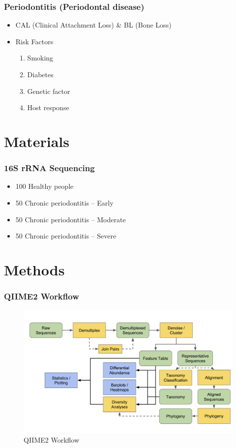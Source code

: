 \documentclass{beamer}
\begin{document}
    \begin{frame}
        \frametitle{Periodontitis (Periodontal disease)}

        \begin{itemize}
            \item CAL (Clinical Attachment Loss) \& BL (Bone Loss) \cite{periodontitis1}
            \item Risk Factors \cite{periodontitis2}
            \begin{enumerate}
                \item Smoking
                \item Diabetes
                \item Genetic factor
                \item Host response
            \end{enumerate}
        \end{itemize}
    \end{frame}

    \section{Materials}
    \begin{frame}
        \frametitle{16S rRNA Sequencing}

        \begin{itemize}
            \item 100 Healthy people
            \item 50 Chronic periodontitis -- Early
            \item 50 Chronic periodontitis -- Moderate
            \item 50 Chronic periodontitis -- Severe
        \end{itemize}
    \end{frame}

    \section{Methods}
    \begin{frame}
        \frametitle{QIIME2 Workflow}

        \begin{figure}
            \centering
            \includegraphics[width=0.7 \linewidth]{figures/qiime.png}
            \caption{QIIME2 Workflow \protect\cite{qiime1, qiime2}}
            \label{fig:qiime}
        \end{figure}
    \end{frame}
\end{document}

